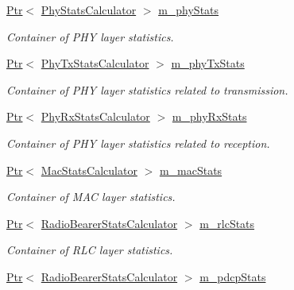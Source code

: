 \begin{DoxyCompactItemize}
\item 
\hyperlink{classns3_1_1Ptr}{Ptr}$<$ \hyperlink{classns3_1_1PhyStatsCalculator}{Phy\+Stats\+Calculator} $>$ \hyperlink{classns3_1_1LteHelper_aa58d6da60336a1a62434e737007f66d4}{m\+\_\+phy\+Stats}
\begin{DoxyCompactList}\small\item\em Container of P\+HY layer statistics. \end{DoxyCompactList}\item 
\hyperlink{classns3_1_1Ptr}{Ptr}$<$ \hyperlink{classns3_1_1PhyTxStatsCalculator}{Phy\+Tx\+Stats\+Calculator} $>$ \hyperlink{classns3_1_1LteHelper_a6bd4ce0109b43d51150164038eba7a01}{m\+\_\+phy\+Tx\+Stats}
\begin{DoxyCompactList}\small\item\em Container of P\+HY layer statistics related to transmission. \end{DoxyCompactList}\item 
\hyperlink{classns3_1_1Ptr}{Ptr}$<$ \hyperlink{classns3_1_1PhyRxStatsCalculator}{Phy\+Rx\+Stats\+Calculator} $>$ \hyperlink{classns3_1_1LteHelper_a836b5bbfbc6a350d578833309f237854}{m\+\_\+phy\+Rx\+Stats}
\begin{DoxyCompactList}\small\item\em Container of P\+HY layer statistics related to reception. \end{DoxyCompactList}\item 
\hyperlink{classns3_1_1Ptr}{Ptr}$<$ \hyperlink{classns3_1_1MacStatsCalculator}{Mac\+Stats\+Calculator} $>$ \hyperlink{classns3_1_1LteHelper_a4b5eb57c346e6876a53d5c79f629513a}{m\+\_\+mac\+Stats}
\begin{DoxyCompactList}\small\item\em Container of M\+AC layer statistics. \end{DoxyCompactList}\item 
\hyperlink{classns3_1_1Ptr}{Ptr}$<$ \hyperlink{classns3_1_1RadioBearerStatsCalculator}{Radio\+Bearer\+Stats\+Calculator} $>$ \hyperlink{classns3_1_1LteHelper_af7f4c5fa0fa5e6855be8f13a797ba726}{m\+\_\+rlc\+Stats}
\begin{DoxyCompactList}\small\item\em Container of R\+LC layer statistics. \end{DoxyCompactList}\item 
\hyperlink{classns3_1_1Ptr}{Ptr}$<$ \hyperlink{classns3_1_1RadioBearerStatsCalculator}{Radio\+Bearer\+Stats\+Calculator} $>$ \hyperlink{classns3_1_1LteHelper_ab69bc074f3e3e4c80fcfb3afcb708ffa}{m\+\_\+pdcp\+Stats}

\end{DoxyCompactItemize}
